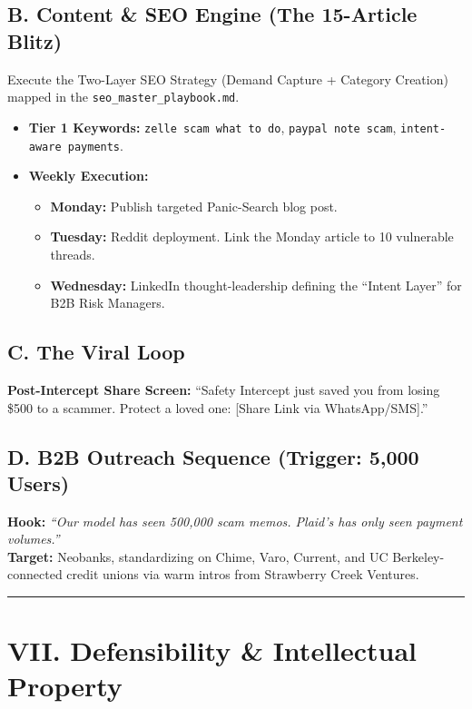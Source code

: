 \documentclass[11pt, letterpaper]{article}
\begin{document}
\subsection*{B. Content \& SEO Engine (The 15-Article Blitz)}
Execute the Two-Layer SEO Strategy (Demand Capture + Category Creation) mapped in the \texttt{seo\_master\_playbook.md}.

\begin{itemize}
    \item \textbf{Tier 1 Keywords:} \texttt{zelle scam what to do}, \texttt{paypal note scam}, \texttt{intent-aware payments}.
    \item \textbf{Weekly Execution:}
    \begin{itemize}
        \item \textbf{Monday:} Publish targeted Panic-Search blog post.
        \item \textbf{Tuesday:} Reddit deployment. Link the Monday article to 10 vulnerable threads.
        \item \textbf{Wednesday:} LinkedIn thought-leadership defining the ``Intent Layer'' for B2B Risk Managers.
    \end{itemize}
\end{itemize}

\subsection*{C. The Viral Loop}
\textbf{Post-Intercept Share Screen:} ``Safety Intercept just saved you from losing \$500 to a scammer. Protect a loved one: [Share Link via WhatsApp/SMS].''

\subsection*{D. B2B Outreach Sequence (Trigger: 5,000 Users)}
\textbf{Hook:} \textit{``Our model has seen 500,000 scam memos. Plaid's has only seen payment volumes.''}\\
\textbf{Target:} Neobanks, standardizing on Chime, Varo, Current, and UC Berkeley-connected credit unions via warm intros from Strawberry Creek Ventures.

\vspace{12pt}
\hrule
\vspace{12pt}

\section*{VII. Defensibility \& Intellectual Property}
\end{document}
